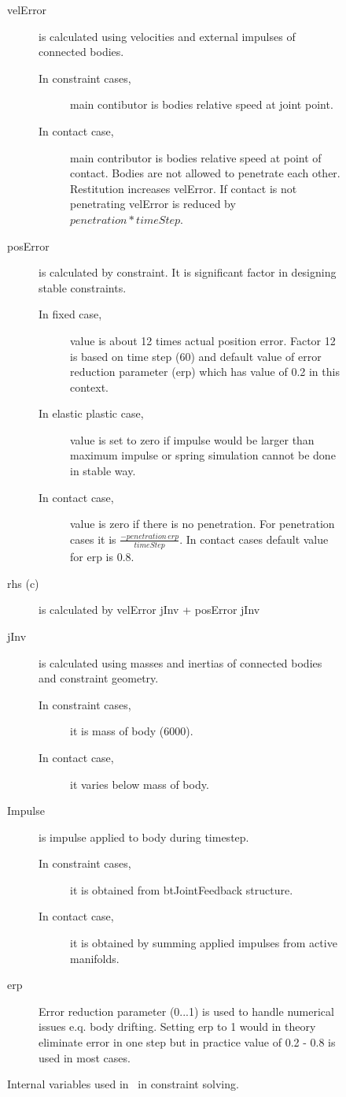 \begin{figure}[htb!]
\begin{description}
\item[velError] is calculated using velocities and external impulses of connected bodies.  
 \begin{description}
\item[In constraint cases,] main contibutor is bodies relative speed at joint point.
\item[In contact case,] main contributor is bodies relative speed at point of contact. 
Bodies are not allowed to penetrate each other. Restitution increases velError.
If contact is not penetrating velError is reduced by $penetration * timeStep$.
\end{description}
\item[posError] is calculated by constraint. It is significant factor in designing stable constraints.
 \begin{description}
 \item[In fixed case,] value is about 12 times actual position error. Factor 12 is based on time step (60) 
 and default value of error reduction parameter (erp) which has value of 0.2 in this context.
 \item[In elastic plastic case,]  value is set to zero if impulse would be larger than maximum impulse or
spring simulation cannot be done in stable way.
 \item[In contact case,] value is zero if there is no penetration. For penetration cases it is 
$\frac{-penetration\, erp}{timeStep}$. In contact cases default value for erp is 0.8.
 \end{description}
\item[rhs (c)] is calculated by velError jInv + posError jInv
\item[jInv] is calculated using masses and inertias of connected bodies and constraint geometry. 
 \begin{description}
\item[In constraint cases,] it is mass of body (6000).
\item[In contact case,] it varies below mass of body.
\end{description}
\item[Impulse] is impulse applied to body during timestep.
 \begin{description}
\item[In constraint cases,] it is obtained from btJointFeedback structure.
\item[In contact case,] it is obtained by summing applied impulses from active manifolds.
\end{description}
\item[erp] Error reduction parameter (0...1) is used to handle numerical issues e.q. body drifting. 
Setting erp to 1 would in theory eliminate error in one step but in practice value of 0.2 - 0.8 is used in most cases.
\end{description}
\caption{Internal variables used in \bullet\ in constraint solving.}
\label{fig:solVars}
\end{figure}

